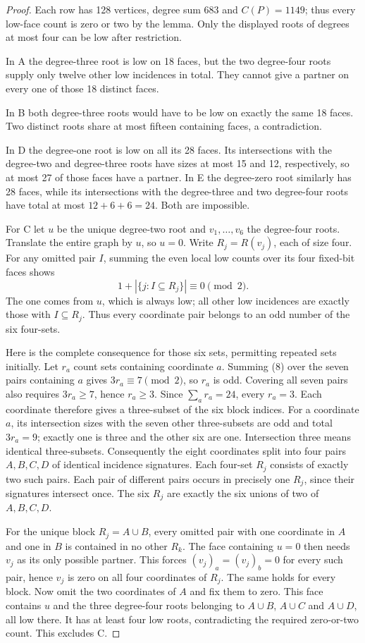\documentclass{article}
\begin{document}
\begin{proof}
Each row has 128 vertices, degree sum 683 and $C(P)=1149$; thus every
low-face count is zero or two by the lemma. Only the displayed roots of
degrees at most four can be low after restriction.

In A the degree-three root is low on 18 faces, but the two degree-four
roots supply only twelve other low incidences in total. They cannot give
a partner on every one of those 18 distinct faces.

In B both degree-three roots would have to be low on exactly the same
18 faces. Two distinct roots share at most fifteen containing faces,
a contradiction.

In D the degree-one root is low on all its 28 faces. Its intersections
with the degree-two and degree-three roots have sizes at most 15 and 12,
respectively, so at most 27 of those faces have a partner.
In E the degree-zero root similarly has 28 faces, while its intersections
with the degree-three and two degree-four roots have total at most
$12+6+6=24$. Both are impossible.

For C let $u$ be the unique degree-two root and $v_1,\ldots,v_6$ the
degree-four roots. Translate the entire graph by $u$, so $u=0$.
Write $R_j=R(v_j)$, each of size four. For any omitted pair $I$, summing
the even local low counts over its four fixed-bit faces shows
\[
 1+|\{j:I\subseteq R_j\}|\equiv0\pmod2.                    \tag{8}
\]
The one comes from $u$, which is always low; all other low incidences
are exactly those with $I\subseteq R_j$. Thus every coordinate pair
belongs to an odd number of the six four-sets.

Here is the complete consequence for those six sets, permitting repeated
sets initially. Let $r_a$ count sets containing coordinate $a$. Summing
(8) over the seven pairs containing $a$ gives $3r_a\equiv7\pmod2$,
so $r_a$ is odd. Covering all seven pairs also requires $3r_a\ge7$,
hence $r_a\ge3$. Since $\sum_a r_a=24$, every $r_a=3$.
Each coordinate therefore gives a three-subset of the six block indices.
For a coordinate $a$, its intersection sizes with the seven other
three-subsets are odd and total $3r_a=9$; exactly one is three and the
other six are one. Intersection three means identical three-subsets.
Consequently the eight coordinates split into four pairs $A,B,C,D$ of
identical incidence signatures. Each four-set $R_j$ consists of exactly
two such pairs. Each pair of different pairs occurs in precisely one
$R_j$, since their signatures intersect once. The six $R_j$ are exactly
the six unions of two of $A,B,C,D$.

For the unique block $R_j=A\cup B$, every omitted pair with one
coordinate in $A$ and one in $B$ is contained in no other $R_k$.
The face containing $u=0$ then needs $v_j$ as its only possible partner.
This forces $(v_j)_a=(v_j)_b=0$ for every such pair, hence $v_j$ is zero
on all four coordinates of $R_j$. The same holds for every block.
Now omit the two coordinates of $A$ and fix them to zero. This face
contains $u$ and the three degree-four roots belonging to $A\cup B$,
$A\cup C$ and $A\cup D$, all low there. It has at least four low roots,
contradicting the required zero-or-two count. This excludes C.
\end{proof}
\end{document}
